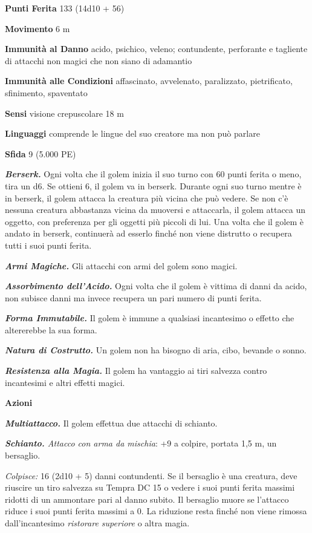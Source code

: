 \begin{multicols}{2}
\textbf{Punti Ferita} 133 (14d10 + 56)

\textbf{Movimento} 6 m

\textbf{Immunità al Danno} acido, psichico, veleno; contundente,
perforante e tagliente di attacchi non magici che non siano di adamantio

\textbf{Immunità alle Condizioni} affascinato, avvelenato, paralizzato,
pietrificato, sfinimento, spaventato

\textbf{Sensi} visione crepuscolare 18 m

\textbf{Linguaggi} comprende le lingue del suo creatore ma non può
parlare

\textbf{Sfida} 9 (5.000 PE)

\emph{\textbf{Berserk.}} Ogni volta che il golem inizia il suo turno con
60 punti ferita o meno, tira un d6. Se ottieni 6, il golem va in
berserk. Durante ogni suo turno mentre è in berserk, il golem attacca la
creatura più vicina che può vedere. Se non c'è nessuna creatura
abbastanza vicina da muoversi e attaccarla, il golem attacca un oggetto,
con preferenza per gli oggetti più piccoli di lui. Una volta che il
golem è andato in berserk, continuerà ad esserlo finché non viene
distrutto o recupera tutti i suoi punti ferita.

\emph{\textbf{Armi Magiche.}} Gli attacchi con armi del golem sono
magici.

\emph{\textbf{Assorbimento dell'Acido.}} Ogni volta che il golem è
vittima di danni da acido, non subisce danni ma invece recupera un pari
numero di punti ferita.

\emph{\textbf{Forma Immutabile.}} Il golem è immune a qualsiasi
incantesimo o effetto che altererebbe la sua forma.

\emph{\textbf{Natura di Costrutto.}} Un golem non ha bisogno di aria,
cibo, bevande o sonno.

\emph{\textbf{Resistenza alla Magia.}} Il golem ha vantaggio ai tiri
salvezza contro incantesimi e altri effetti magici.

\textbf{Azioni}

\emph{\textbf{Multiattacco.}} Il golem effettua due attacchi di
schianto.

\emph{\textbf{Schianto.} Attacco con arma da mischia}: +9 a colpire,
portata 1,5 m, un bersaglio.

\emph{Colpisce:} 16 (2d10 + 5) danni contundenti. Se il bersaglio è una
creatura, deve riuscire un tiro salvezza su Tempra DC 15 o vedere
i suoi punti ferita massimi ridotti di un ammontare pari al danno
subito. Il bersaglio muore se l'attacco riduce i suoi punti ferita
massimi a 0. La riduzione resta finché non viene rimossa
dall'incantesimo \emph{ristorare superiore} o altra magia.


\end{multicols}
